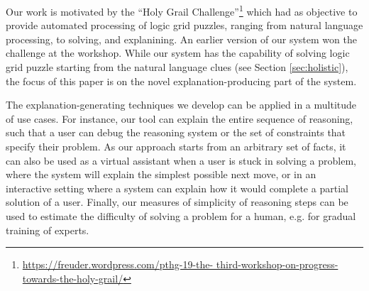 Our work is motivated by the ``Holy Grail Challenge''\footnote{\tiny \url{https://freuder.wordpress.com/pthg-19-the- third-workshop-on-progress-towards-the-holy-grail/}} which had as objective to provide automated processing of logic grid puzzles, ranging from natural language processing, to solving, and explanining. 
An earlier version of our system won the challenge at the workshop. 
While our system has the capability of solving logic grid puzzle starting from the natural language clues (see Section \ref{sec:holistic}), the focus of this paper is on the novel explanation-producing part of the system.

The explanation-generating techniques we develop can be applied in a multitude of use cases. 
For instance, our tool can explain the entire sequence of reasoning, such that a user can debug the reasoning system or the set of constraints that specify their problem. %
As our approach starts from an arbitrary set of facts, it can also be used as a virtual assistant when a user is stuck in solving a problem, where the system will explain the simplest possible next move, or in an interactive setting where a system can explain how it would complete a partial solution of a user.
Finally, our measures of simplicity of reasoning steps can be used to estimate the difficulty of solving a problem for a human, e.g. for gradual training of experts.


